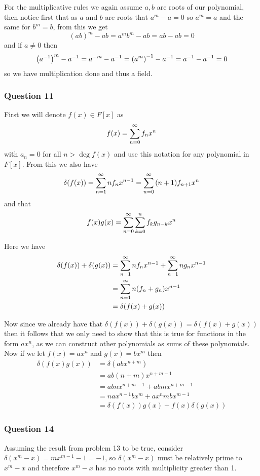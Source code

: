 \documentclass{article}
\begin{document}
For the multiplicative rules we again assume $a,b$ are roots of our polynomial, then notice first that as $a$ and $b$ are roots that $a^m-a = 0$ so $a^m =a$ and the same for $b^m=b$, from this we get 
$$(ab)^m-ab=a^mb^m-ab=ab-ab=0$$
and if $a\not=0$ then $$\left({a}^{-1}\right)^m-{a}^{-1} = a^{-m}-{a}^{-1} = {\left(a^m\right)}^{-1}-{a}^{-1} = {a}^{-1} -{a}^{-1} = 0$$ so we have multiplication done and thus a field.

\subsubsection{Question 11}
First we will denote $f(x) \in F[x]$ as $$f(x) = \sum\limits_{n=0}^{\infty}  {f_nx^n} $$ with $a_n = 0$ for all $n > \deg f(x)$ and use this notation for any polynomial in $F[x]$. From this we also have $$\delta(f(x)) = \sum\limits_{n=1}^{\infty}  {nf_nx^{n-1}}  = \sum\limits_{n=0}^{\infty}  {(n+1)f_{n+1}x^n} $$ and that $$f(x)g(x) = \sum\limits_{n=0}^{\infty}  {\sum\limits_{k=0}^{n}  {f_kg_{n-k}}  x^n} $$

 Here we have
\begin{align*}
\delta(f(x))+\delta(g(x))&=\sum\limits_{n=1}^{\infty}  {nf_nx^{n-1}} +\sum\limits_{n=1}^{\infty}  {ng_nx^{n-1}} \\
	&= \sum\limits_{n=1}^{\infty}  {n(f_n+g_n)x^{n-1}} \\
	&=\delta(f(x)+g(x))
\end{align*}

 Now since we already have that $\delta(f(x))+\delta(g(x)) = \delta(f(x)+g(x))$ then it follows that we only need to show that this is true for functions in the form $ax^n$, as we can construct other polynomials as sums of these polynomials. Now if we let $f(x) = ax^n$ and $g(x)=bx^m$ then \begin{align*}
\delta(f(x)g(x)) &= \delta(abx^{n+m})\\
&= ab(n+m)x^{n+m-1}\\
&= abnx^{n+m-1}+abmx^{n+m-1} \\
&= nax^{n-1}bx^m + ax^nmbx^{m-1}\\
&= \delta(f(x))g(x)+f(x)\delta(g(x))
\end{align*}


\subsubsection{Question 14}

Assuming the result from problem 13 to be true, consider $\delta(x^m-x) = mx^{m-1}-1 = -1$, so $\delta(x^m-x)$ must be relatively prime to $x^m-x$ and therefore $x^m-x$ has no roots with multiplicity greater than 1.
\end{document}
